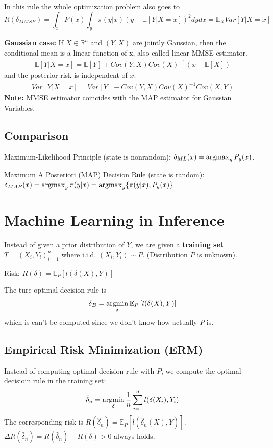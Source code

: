 \documentclass[11pt,a4paper]{article}
\newcommand{\argmax}{\operatornamewithlimits{argmax}}
\newcommand{\argmin}{\operatornamewithlimits{argmin}}
\begin{document}
In this rule the whole optimization problem also goes to
$$R(\delta_{MMSE})=\int_x P(x)\int_y \pi(y|x) (y-\mathbb{E}\left[Y|X=x\right])^2 dy dx=\mathbb{E}_X Var\left[Y|X=x\right]$$

\textbf{Gaussian case:}
If $X\in \mathbb{R}^n$ and $(Y,X)$ are jointly Gaussian, then the conditional mean is a linear function of x, also called linear MMSE estimator.
\begin{equation}
    \begin{aligned}
        \mathbb{E}\left[Y|X=x\right]=\mathbb{E}[Y]+Cov(Y,X)Cov(X)^{-1}(x-\mathbb{E}[X])
    \end{aligned}
    \nonumber
\end{equation}
and the posterior risk is independent of $x$:
\begin{equation}
    \begin{aligned}
        Var\left[Y|X=x\right]=Var[Y]-Cov(Y,X)Cov(X)^{-1}Cov(X,Y)
    \end{aligned}
    \nonumber
\end{equation}
\underline{\textbf{Note:}} MMSE estimator coincides with the MAP estimator for Gaussian Variables.

\subsection{Comparison}
Maximum-Likelihood Principle (state is nonrandom): $\delta_{ML}(x)=\argmax_y P_y(x)$.

Maximum A Posteriori (MAP) Decision Rule (state is random): $\delta_{MAP}(x)=\argmax_y \pi(y|x)=\argmax_y \{\pi(y|x),P_y(x)\}$


\section{Machine Learning in Inference}
Instead of given a prior distribution of $Y$, we are given a \textbf{training set} $T=(X_i,Y_i)_{i=1}^n$ where i.i.d. $(X_i,Y_i)\sim P$. (Distribution $P$ is unknown).

Risk: $R(\delta)=\mathbb{E}_P\left[l(\delta(X),Y)\right]$

The ture optimal decision rule is $$\delta_B=\argmin_\delta \mathbb{E}_P\left[l(\delta(X),Y)\right]$$
which is can't be computed since we don't know how actually $P$ is.

\subsection{Empirical Risk Minimization (ERM)}
Instead of computing optimal decision rule with $P$, we compute the optimal decisioin rule in the training set:
$$\hat{\delta}_n=\argmin_\delta \frac{1}{n}\sum_{i=1}^nl(\delta(X_i),Y_i)$$
The corresponding risk is $R(\hat{\delta}_n)=\mathbb{E}_P\left[l(\hat{\delta}_n(X),Y)\right]$. $\Delta R(\hat{\delta}_n)=R(\hat{\delta}_n)- R(\delta)>0$ always holds.
\end{document}
